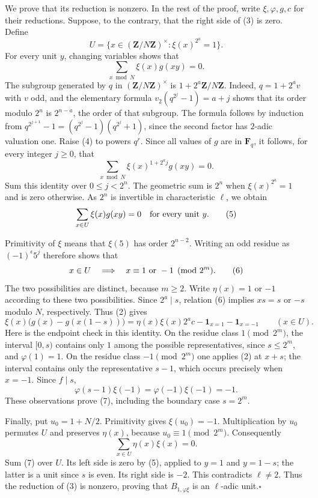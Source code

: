 \documentclass[11pt,a4paper]{article}
\theoremstyle{remark}
\begin{document}
We prove that its reduction is nonzero.  In the rest of the proof,
write $\xi,\varphi,g,c$ for their reductions.  Suppose, to the contrary,
that the right side of (3) is zero.  Define
\[
 U=\{x\in(\mathbf Z/N\mathbf Z)^\times:
                    \xi(x)^{2^a}=1\}.
\]
For every unit $y$, changing variables shows that
\[
 \sum_{x\bmod N}\xi(x)g(xy)=0.
 \tag{4}
\]
The subgroup generated by $q$ in $(\mathbf Z/N\mathbf Z)^\times$
is $1+2^a\mathbf Z/N\mathbf Z$.  Indeed, $q=1+2^a v$ with $v$ odd,
and the elementary formula
$v_2(q^{2^j}-1)=a+j$ shows that its order modulo $2^n$ is
$2^{n-a}$, the order of that subgroup.
The formula follows by induction from
$q^{2^{j+1}}-1=(q^{2^j}-1)(q^{2^j}+1)$, since the second factor
has $2$-adic valuation one.
Raise (4) to powers $q^r$.  Since all values of $g$ are in
$\mathbf F_q$, it follows, for every integer $j\geq0$, that
\[
 \sum_{x\bmod N}\xi(x)^{1+2^aj}g(xy)=0.
\]
Sum this identity over $0\leq j<2^n$.  The geometric sum is $2^n$
when $\xi(x)^{2^a}=1$ and is zero otherwise.  As $2^n$ is invertible
in characteristic $\ell$, we obtain
\[
 \sum_{x\in U}\xi(x)g(xy)=0
 \quad\hbox{for every unit }y.
 \tag{5}
\]

Primitivity of $\xi$ means that $\xi(5)$ has order $2^{n-2}$.
Writing an odd residue as $(-1)^\epsilon5^j$ therefore shows that
\[
 x\in U\quad\Longrightarrow\quad x\equiv1\ \hbox{or}\ -1\pmod{2^m}.
 \tag{6}
\]
The two possibilities are distinct, because $m\geq2$.  Write
$\eta(x)=1$ or $-1$ according to these two possibilities.
Since $2^a\mid s$, relation (6) implies
$xs=s$ or $-s$ modulo $N$, respectively.  Thus (2) gives
\[
 \xi(x)\bigl(g(x)-g(x(1-s))\bigr)
 =\eta(x)\xi(x)2^ac
       -\mathbf1_{x=1}-\mathbf1_{x=-1}
 \qquad(x\in U).
 \tag{7}
\]
Here is the endpoint check in this identity.  On the residue class
$1\pmod{2^m}$, the interval $[0,s)$ contains only $1$ among the
possible representatives, since $s\leq2^m$, and $\varphi(1)=1$.
On the residue class $-1\pmod{2^m}$ one applies (2) at $x+s$;
the interval contains only the representative $s-1$, which occurs
precisely when $x=-1$.  Since $f\mid s$,
\[
 \varphi(s-1)\xi(-1)=\varphi(-1)\xi(-1)=-1.
\]
These observations prove (7), including the boundary case $s=2^m$.

Finally, put $u_0=1+N/2$.  Primitivity gives $\xi(u_0)=-1$.
Multiplication by $u_0$ permutes $U$ and preserves $\eta(x)$,
because $u_0\equiv1\pmod{2^m}$.  Consequently
\[
 \sum_{x\in U}\eta(x)\xi(x)=0.
\]
Sum (7) over $U$.  Its left side is zero by (5), applied to
$y=1$ and $y=1-s$; the latter is a unit since $s$ is even.
Its right side is $-2$.  This contradicts $\ell\ne2$.
Thus the reduction of (3) is nonzero, proving that
$B_{1,\varphi\xi}$ is an $\ell$-adic unit.\hfill$\square$
\end{document}
